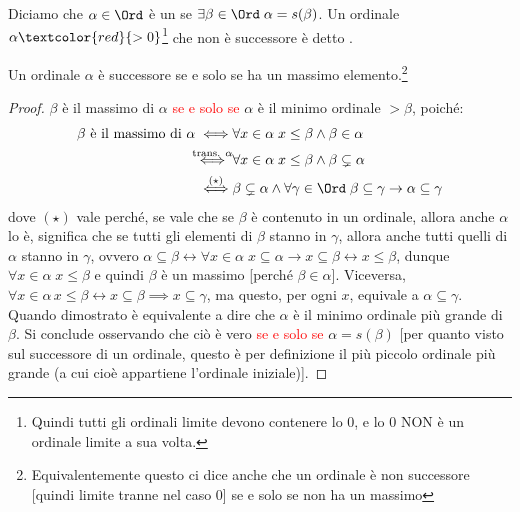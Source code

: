 \documentclass[11pt]{scrartcl}
\begin{document}
\begin{definition}
	Diciamo che $\alpha \in \Ord$ è un  se $\exists \beta \in \Ord \; \alpha = s(\beta)$. Un ordinale $\alpha \textcolor{red}{>0}$\footnote{Quindi tutti gli ordinali limite devono contenere lo 0, e lo 0 NON è un ordinale limite a sua volta.}
	che non è successore è detto .
\end{definition}

\begin{remark}
	Un ordinale $\alpha$ è successore se e solo se ha un massimo elemento.\footnote{Equivalentemente questo ci dice anche che un ordinale è non successore [quindi limite tranne nel caso 0] se e solo se non ha un massimo}
\end{remark}

\begin{proof}
	$\beta$ è il massimo di $\alpha$ \textcolor{red}{se e solo se} $\alpha$ è il minimo ordinale $>\beta$, poiché:
	\[ \begin{split}
		\text{$\beta$ è il massimo di $\alpha$} \iff & \forall x \in \alpha \; x \leq \beta \land \beta \in \alpha\\
												\overset{\text{trans. $\alpha$}}{\iff} & \forall x \in \alpha \; x \leq \beta \land \beta \subsetneq \alpha\\
												\overset{(\star)}{\iff} & \beta \subsetneq \alpha \land \forall \gamma \in \Ord \; \beta \subseteq \gamma \rightarrow \alpha \subseteq \gamma
	\end{split}
		\]
	dove $(\star)$ vale perché, se vale che se $\beta$ è contenuto in un ordinale, allora anche $\alpha$ lo è, significa che se tutti gli elementi di $\beta$ stanno in $\gamma$, allora anche tutti quelli
	di $\alpha$ stanno in $\gamma$, ovvero $\alpha \subseteq \beta \leftrightarrow \forall x \in \alpha \; x \subseteq \alpha \rightarrow x \subseteq \beta \leftrightarrow x \leq \beta$,
	dunque $\forall x \in \alpha \; x \leq \beta$ e quindi $\beta$ è un massimo [perché $\beta \in \alpha$]. Viceversa, $\forall x \in \alpha \, x \leq \beta \leftrightarrow x \subseteq \beta \implies x \subseteq \gamma$, ma questo, per ogni $x$, equivale a $\alpha \subseteq \gamma$.\\
	Quando dimostrato è equivalente a dire che $\alpha$ è il minimo ordinale più grande di $\beta$. Si conclude osservando che ciò è vero \textcolor{red}{se e solo se} $\alpha = s(\beta)$ [per quanto visto sul successore di un ordinale, questo è per definizione il
	più piccolo ordinale più grande (a cui cioè appartiene l'ordinale iniziale)].
\end{proof}
\end{document}
